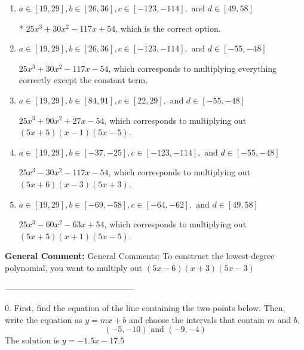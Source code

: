 \documentclass{extbook}[14pt]
\begin{document}
\begin{enumerate}[label=\Alph*.] 
\item $ a \in [19, 29], b \in [26, 36], c \in [-123, -114], \text{ and } d \in [49, 58] $ 

 * $25x^{3} +30 x^{2} -117 x + 54$, which is the correct option. 
\item $ a \in [19, 29], b \in [26, 36], c \in [-123, -114], \text{ and } d \in [-55, -48] $ 

 $25x^{3} +30 x^{2} -117 x -54$, which corresponds to multiplying everything correctly except the constant term. 
\item $ a \in [19, 29], b \in [84, 91], c \in [22, 29], \text{ and } d \in [-55, -48] $ 

 $25x^{3} +90 x^{2} +27 x -54$, which corresponds to multiplying out $(5x + 5)(x -1)(5x -5)$. 
\item $ a \in [19, 29], b \in [-37, -25], c \in [-123, -114], \text{ and } d \in [-55, -48] $ 

 $25x^{3} -30 x^{2} -117 x -54$, which corresponds to multiplying out $(5x + 6)(x -3)(5x + 3)$. 
\item $ a \in [19, 29], b \in [-69, -58], c \in [-64, -62], \text{ and } d \in [49, 58] $ 

 $25x^{3} -60 x^{2} -63 x + 54$, which corresponds to multiplying out $(5x + 5)(x + 1)(5x -5)$. 
\end{enumerate} 
 
\textbf{General Comment:} General Comments: To construct the lowest-degree polynomial, you want to multiply out $(5x -6)(x + 3)(5x -3)$ 

-----------------------------------------------

0. First, find the equation of the line containing the two points below. Then, write the equation as $ y=mx+b $ and choose the intervals that contain $m$ and $b$.
\[ (-5, -10) \text{ and } (-9, -4) \] 
The solution is $ y = -1.5x -17.5 $ 
\end{document}
